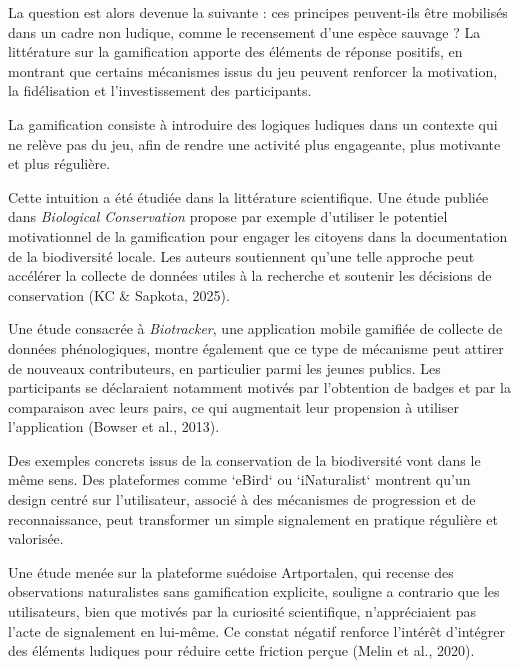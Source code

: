 \documentclass[a4paper,11pt]{article}
\begin{document}
La question est alors devenue la suivante : ces principes peuvent-ils être mobilisés dans un cadre non ludique, comme le recensement d’une espèce sauvage ? La littérature sur la gamification apporte des éléments de réponse positifs, en montrant que certains mécanismes issus du jeu peuvent renforcer la motivation, la fidélisation et l’investissement des participants.

La gamification consiste à introduire des logiques ludiques dans un contexte qui ne relève pas du jeu, afin de rendre une activité plus engageante, plus motivante et plus régulière.

Cette intuition a été étudiée dans la littérature scientifique. Une étude publiée dans \textit{Biological Conservation} propose par exemple d’utiliser le potentiel motivationnel de la gamification pour engager les citoyens dans la documentation de la biodiversité locale. Les auteurs soutiennent qu’une telle approche peut accélérer la collecte de données utiles à la recherche et soutenir les décisions de conservation (KC \& Sapkota, 2025).

Une étude consacrée à \textit{Biotracker}, une application mobile gamifiée de collecte de données phénologiques, montre également que ce type de mécanisme peut attirer de nouveaux contributeurs, en particulier parmi les jeunes publics. Les participants se déclaraient notamment motivés par l’obtention de badges et par la comparaison avec leurs pairs, ce qui augmentait leur propension à utiliser l’application (Bowser et al., 2013).

Des exemples concrets issus de la conservation de la biodiversité vont dans le même sens. Des plateformes comme `eBird` ou `iNaturalist` montrent qu’un design centré sur l’utilisateur, associé à des mécanismes de progression et de reconnaissance, peut transformer un simple signalement en pratique régulière et valorisée.

Une étude menée sur la plateforme suédoise Artportalen, qui recense des observations naturalistes sans gamification explicite, souligne a contrario que les utilisateurs, bien que motivés par la curiosité scientifique, n'appréciaient pas l'acte de signalement en lui-même. Ce constat négatif renforce l'intérêt d'intégrer des éléments ludiques pour réduire cette friction perçue (Melin et al., 2020).
\end{document}
